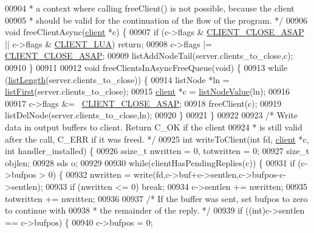 \begin{DoxyCode}
{{{{{{{{{{00904 \textcolor{comment}{ * a context where calling freeClient() is not possible, because the client}
00905 \textcolor{comment}{ * should be valid for the continuation of the flow of the program. */}
00906 \textcolor{keywordtype}{void} freeClientAsync(\hyperlink{structclient}{client} *c) \{
00907     \textcolor{keywordflow}{if} (c->flags & \hyperlink{server_8h_ad6690c6231b67525b8b2057e092a8361}{CLIENT\_CLOSE\_ASAP} || c->flags & 
      \hyperlink{server_8h_af9d0b0f45ef2c1fd29ac714a300de706}{CLIENT\_LUA}) \textcolor{keywordflow}{return};
00908     c->flags |= \hyperlink{server_8h_ad6690c6231b67525b8b2057e092a8361}{CLIENT\_CLOSE\_ASAP};
00909     listAddNodeTail(server.clients\_to\_close,c);
00910 \}
00911 
00912 \textcolor{keywordtype}{void} freeClientsInAsyncFreeQueue(\textcolor{keywordtype}{void}) \{
00913     \textcolor{keywordflow}{while} (\hyperlink{adlist_8h_afde0ab079f934670e82119b43120e94b}{listLength}(server.clients\_to\_close)) \{
00914         listNode *ln = \hyperlink{adlist_8h_aa8dc514bbe217bb2e87c1c77cfa84690}{listFirst}(server.clients\_to\_close);
00915         \hyperlink{structclient}{client} *c = \hyperlink{adlist_8h_af84cae230e7180ebcda1e2736fce9f65}{listNodeValue}(ln);
00916 
00917         c->flags &= ~\hyperlink{server_8h_ad6690c6231b67525b8b2057e092a8361}{CLIENT\_CLOSE\_ASAP};
00918         freeClient(c);
00919         listDelNode(server.clients\_to\_close,ln);
00920     \}
00921 \}
00922 
00923 \textcolor{comment}{/* Write data in output buffers to client. Return C\_OK if the client}
00924 \textcolor{comment}{ * is still valid after the call, C\_ERR if it was freed. */}
00925 \textcolor{keywordtype}{int} writeToClient(\textcolor{keywordtype}{int} fd, \hyperlink{structclient}{client} *c, \textcolor{keywordtype}{int} handler\_installed) \{
00926     ssize\_t nwritten = 0, totwritten = 0;
00927     size\_t objlen;
00928     sds o;
00929 
00930     \textcolor{keywordflow}{while}(clientHasPendingReplies(c)) \{
00931         \textcolor{keywordflow}{if} (c->bufpos > 0) \{
00932             nwritten = write(fd,c->buf+c->sentlen,c->bufpos-c->sentlen);
00933             \textcolor{keywordflow}{if} (nwritten <= 0) \textcolor{keywordflow}{break};
00934             c->sentlen += nwritten;
00935             totwritten += nwritten;
00936 
00937             \textcolor{comment}{/* If the buffer was sent, set bufpos to zero to continue with}
00938 \textcolor{comment}{             * the remainder of the reply. */}
00939             \textcolor{keywordflow}{if} ((\textcolor{keywordtype}{int})c->sentlen == c->bufpos) \{
00940                 c->bufpos = 0;
}}}}}}}}}}
\end{DoxyCode}
